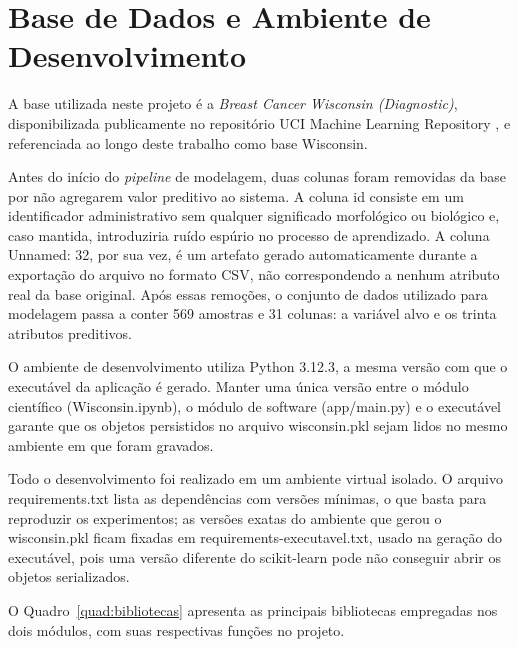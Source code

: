 \documentclass[
    12pt
    ,oneside
    ,a4paper
    ,chapter=TITLE
    ,section=TITLE
    ,sumario=abnt-6027-2012
    ,english,brazil]{abntex2} %
\begin{document}
\section{Base de Dados e Ambiente de Desenvolvimento}
\label{sec:base-ambiente}

A base utilizada neste projeto é a \textit{Breast Cancer Wisconsin
(Diagnostic)}, disponibilizada publicamente no repositório UCI Machine Learning
Repository \cite{Wolberg1995}, e referenciada ao longo
deste trabalho como base Wisconsin.


Antes do início do \textit{pipeline} de modelagem, duas colunas foram removidas
da base por não agregarem valor preditivo ao sistema. A coluna id consiste em um
identificador administrativo sem qualquer significado morfológico ou biológico e,
caso mantida, introduziria ruído espúrio no processo de aprendizado. A coluna
Unnamed: 32, por sua vez, é um artefato gerado automaticamente durante a
exportação do arquivo no formato CSV, não correspondendo a nenhum atributo real
da base original. Após essas remoções, o conjunto de dados utilizado para
modelagem passa a conter 569 amostras e 31 colunas: a variável alvo e os trinta
atributos preditivos.

O ambiente de desenvolvimento utiliza Python 3.12.3, a mesma versão com que o
executável da aplicação é gerado. Manter uma única versão entre o módulo
científico (Wisconsin.ipynb), o módulo de software (app/main.py) e o executável
garante que os objetos persistidos no arquivo wisconsin.pkl sejam lidos no
mesmo ambiente em que foram gravados.

Todo o desenvolvimento foi realizado em um ambiente virtual isolado. O arquivo
requirements.txt lista as dependências com versões mínimas, o que basta para
reproduzir os experimentos; as versões exatas do ambiente que gerou o
wisconsin.pkl ficam fixadas em requirements-executavel.txt, usado na geração do
executável, pois uma versão diferente do scikit-learn pode não conseguir abrir
os objetos serializados.

O Quadro~\ref{quad:bibliotecas} apresenta as principais bibliotecas empregadas
nos dois módulos, com suas respectivas funções no projeto.
\end{document}
